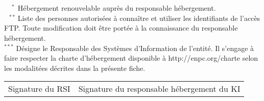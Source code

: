 \documentclass{ki019}
\begin{document}
\pagestyle{empty}

\noindent

\section{}

\begin{center}


\end{center}

\vspace{-0.5cm}
\noindent
$^{\phantom{**}*}$ Hébergement renouvelable auprès du responsable hébergement. \\
$^{\phantom{*}**}$ Liste des personnes autorisées à connaître et utiliser les identifiants de l'accès FTP. Toute modification doit être portée à la connaissance du responsable hébergement. \\
$^{***}$ Désigne le Responsable des Systèmes d'Information de l'entité. Il s'engage à faire respecter la charte d'hébergement disponible à http://enpc.org/charte selon les modalitées décrites dans la présente fiche.

\vspace{0.5cm}
\Large
\begin{tabular}{p{6cm}p{9.5cm}}
Signature du RSI & Signature du responsable hébergement du KI
\end{tabular}

\Footer{\today}
\end{document}
